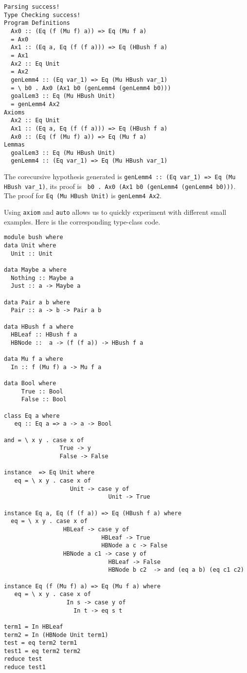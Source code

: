 \documentclass{llncs}
\begin{document}
\begin{verbatim}
Parsing success! 
Type Checking success! 
Program Definitions
  Ax0 :: (Eq (f (Mu f) a)) => Eq (Mu f a)
  = Ax0 
  Ax1 :: (Eq a, Eq (f (f a))) => Eq (HBush f a)
  = Ax1 
  Ax2 :: Eq Unit
  = Ax2 
  genLemm4 :: (Eq var_1) => Eq (Mu HBush var_1)
  = \ b0 . Ax0 (Ax1 b0 (genLemm4 (genLemm4 b0))) 
  goalLem3 :: Eq (Mu HBush Unit)
  = genLemm4 Ax2 
Axioms
  Ax2 :: Eq Unit
  Ax1 :: (Eq a, Eq (f (f a))) => Eq (HBush f a)
  Ax0 :: (Eq (f (Mu f) a)) => Eq (Mu f a)
Lemmas
  goalLem3 :: Eq (Mu HBush Unit)
  genLemm4 :: (Eq var_1) => Eq (Mu HBush var_1)
\end{verbatim}

The corecursive hypothesis generated is  \texttt{genLemm4 :: (Eq var\string_1) => Eq (Mu HBush var\string_1)}, its proof is \texttt{\string\ b0 . Ax0 (Ax1 b0 (genLemm4 (genLemm4 b0)))}. The proof
for \texttt{Eq (Mu HBush Unit)} is \texttt{genLemm4 Ax2}. 

Using \texttt{axiom} and \texttt{auto} allows us to quickly experiment with
different small examples. Here is the corresponding type-class code. 
\begin{verbatim}
module bush where
data Unit where
  Unit :: Unit

data Maybe a where
  Nothing :: Maybe a
  Just :: a -> Maybe a

data Pair a b where
  Pair :: a -> b -> Pair a b

data HBush f a where
  HBLeaf :: HBush f a
  HBNode ::  a -> (f (f a)) -> HBush f a

data Mu f a where
  In :: f (Mu f) a -> Mu f a
  
data Bool where
     True :: Bool
     False :: Bool

class Eq a where
   eq :: Eq a => a -> a -> Bool

and = \ x y . case x of
                True -> y
                False -> False

instance  => Eq Unit where
   eq = \ x y . case x of
                   Unit -> case y of 
                              Unit -> True

instance Eq a, Eq (f (f a)) => Eq (HBush f a) where
  eq = \ x y . case x of
                 HBLeaf -> case y of
                            HBLeaf -> True
                            HBNode a c -> False
                 HBNode a c1 -> case y of
                              HBLeaf -> False
                              HBNode b c2  -> and (eq a b) (eq c1 c2)

instance Eq (f (Mu f) a) => Eq (Mu f a) where
   eq = \ x y . case x of
                  In s -> case y of
 		            In t -> eq s t

term1 = In HBLeaf
term2 = In (HBNode Unit term1)
test = eq term2 term1
test1 = eq term2 term2
reduce test
reduce test1
\end{verbatim}
\end{document}
